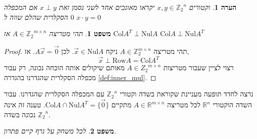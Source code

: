 \documentclass[12pt,leqno]{article}
\theoremstyle{theoremdd}
\newtheorem{theorem}{משפט}[section]
\newtheorem{comm}{הערה}[section]
\newcommand{\Zn}{{\mathbb{Z}_2}^n}
\newcommand{\Col}{\mathrm{Col}}
\newcommand{\Nul}{\mathrm{Nul}}
\begin{document}
\begin{comm}
    וקטורים 
    $x, y \in \Zn $
    יקראו מאונכים אחד לשני נסמן זאת 
    $x \perp  y$
    אם המכפלה הסקלרית שהלם שווה 
    ל
    $0$
    $x \cdot y = 0$
\end{comm}
\begin{theorem}
    \label{the: Nul A and Col AT}
    תהי מטריצה 
    $A \in {\mathbb{Z}_2}^{m \times n }$
    אז 
    $\Col A^T \perp \Nul A$
    $\Col A \perp \Nul A^T$
\end{theorem}
\begin{proof}
    תהי 
    מטריצה
    $A \in \mathbb{Z}_2^{m \times n}$
    ניקח 
    $\vec x \in \mathrm{Nul} A$.
    לכן
    $A\vec x=\vec 0$. 
    אז,
    \[
        \vec x \perp \mathrm{Row}A=\mathrm{Col} A^T
    \]
    רצוי לציין 
    שעבור 
    מטריצות 
    $A \in {Z_2}^{m \times n}$
    מאותם שיקולים אותה הוכחה נכונה,
    רק עבור מכפלה הסקלרית שהגדרנו 
    בהגדרה 
    \ref{def:inner_mul}.
\end{proof}
נרצה לחדד תופעה מעניינת שקוראת בשדה וקטורי 
$\Zn$
עם המכפלה הסקלרית שהגדרנו.
עבור השדה הוקטורי 
$\mathbb{R}^n$
לכל מטריצה 
$A \in \mathbb{R}^{m \times n}$
מתקיים 
$\Col A \cap \Nul A^T = \{ \vec{0}\}$.
טענה זה אינה נכונה בשדה 
$\Zn$.
\begin{theorem}
    \label{thrm: clean game has solution}
    לכל משחק על גרף קיים פתרון.
\end{theorem}
\end{document}
